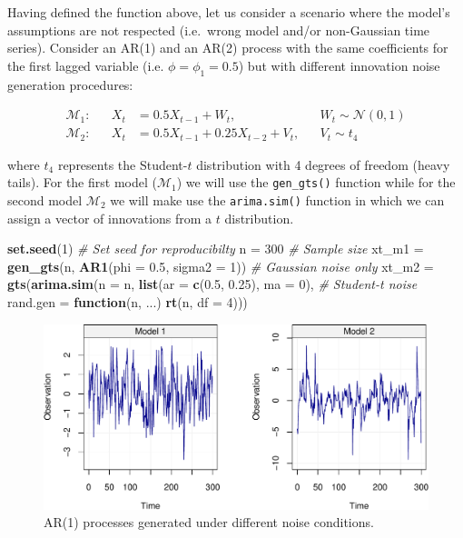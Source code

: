 \documentclass[]{book}
\newenvironment{Shaded}{\begin{snugshade}}{\end{snugshade}}
\newcommand{\KeywordTok}[1]{\textcolor[rgb]{0.13,0.29,0.53}{\textbf{#1}}}
\newcommand{\DataTypeTok}[1]{\textcolor[rgb]{0.13,0.29,0.53}{#1}}
\newcommand{\DecValTok}[1]{\textcolor[rgb]{0.00,0.00,0.81}{#1}}
\newcommand{\FloatTok}[1]{\textcolor[rgb]{0.00,0.00,0.81}{#1}}
\newcommand{\StringTok}[1]{\textcolor[rgb]{0.31,0.60,0.02}{#1}}
\newcommand{\CommentTok}[1]{\textcolor[rgb]{0.56,0.35,0.01}{\textit{#1}}}
\newcommand{\ControlFlowTok}[1]{\textcolor[rgb]{0.13,0.29,0.53}{\textbf{#1}}}
\newcommand{\NormalTok}[1]{#1}
\theoremstyle{definition}
\theoremstyle{definition}
\theoremstyle{definition}
\theoremstyle{remark}
\begin{document}
Having defined the function above, let us consider a scenario where the
model's assumptions are not respected (i.e.~wrong model and/or
non-Gaussian time series). Consider an AR(1) and an AR(2) process with
the same coefficients for the first lagged variable (i.e.
\(\phi = \phi_1 = 0.5\)) but with different innovation noise generation
procedures:

\[
    \begin{aligned}
  \mathcal{M}_1:&{}& X_t &=0.5 X_{t-1} + W_t,&{}& W_t\sim \mathcal{N} (0,1) \\
  \mathcal{M}_2:&{}& X_t &=0.5 X_{t-1} + 0.25 X_{t-2} + V_t,&{}& V_t\sim t_4
  \end{aligned}
\]

where \(t_4\) represents the Student-\(t\) distribution with 4 degrees
of freedom (heavy tails). For the first model (\(\mathcal{M}_1\)) we
will use the \texttt{gen\_gts()} function while for the second model
\(\mathcal{M}_2\) we will make use the \texttt{arima.sim()} function in
which we can assign a vector of innovations from a \(t\) distribution.

\begin{Shaded}
\begin{Highlighting}[]
\KeywordTok{set.seed}\NormalTok{(}\DecValTok{1}\NormalTok{)         }\CommentTok{# Set seed for reproducibilty}
\NormalTok{n =}\StringTok{ }\DecValTok{300}             \CommentTok{# Sample size}
\NormalTok{xt_m1 =}\StringTok{ }\KeywordTok{gen_gts}\NormalTok{(n, }\KeywordTok{AR1}\NormalTok{(}\DataTypeTok{phi =} \FloatTok{0.5}\NormalTok{, }\DataTypeTok{sigma2 =} \DecValTok{1}\NormalTok{))   }\CommentTok{# Gaussian noise only}
\NormalTok{xt_m2 =}\StringTok{ }\KeywordTok{gts}\NormalTok{(}\KeywordTok{arima.sim}\NormalTok{(}\DataTypeTok{n =}\NormalTok{ n, }\KeywordTok{list}\NormalTok{(}\DataTypeTok{ar =} \KeywordTok{c}\NormalTok{(}\FloatTok{0.5}\NormalTok{, }\FloatTok{0.25}\NormalTok{), }\DataTypeTok{ma =} \DecValTok{0}\NormalTok{), }\CommentTok{# Student-t noise}
\DataTypeTok{rand.gen =} \ControlFlowTok{function}\NormalTok{(n, ...) }\KeywordTok{rt}\NormalTok{(n, }\DataTypeTok{df =} \DecValTok{4}\NormalTok{)))}
\end{Highlighting}
\end{Shaded}

\begin{figure}

{\centering \includegraphics{ts_files/figure-latex/mbbdatavis-1} 

}

\caption{AR(1) processes generated under different noise conditions.}\label{fig:mbbdatavis}
\end{figure}
\end{document}
